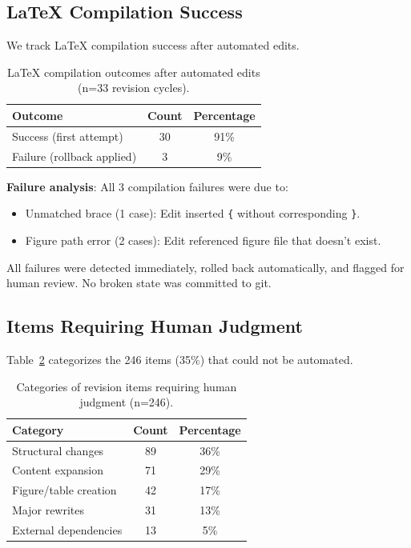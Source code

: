 \subsection{LaTeX Compilation Success}

We track LaTeX compilation success after automated edits.

\begin{table}[t]
\centering
\caption{LaTeX compilation outcomes after automated edits (n=33 revision cycles).}
\label{tab:compilation}
\begin{tabular}{lcc}
\toprule
Outcome & Count & Percentage \\
\midrule
Success (first attempt) & 30 & 91\% \\
Failure (rollback applied) & 3 & 9\% \\
\bottomrule
\end{tabular}
\end{table}

\textbf{Failure analysis}: All 3 compilation failures were due to:
\begin{itemize}
\item Unmatched brace (1 case): Edit inserted \texttt{\{} without corresponding \texttt{\}}.
\item Figure path error (2 cases): Edit referenced figure file that doesn't exist.
\end{itemize}

All failures were detected immediately, rolled back automatically, and flagged for human review. No broken state was committed to git.

\subsection{Items Requiring Human Judgment}
\label{sec:human-required}

Table~\ref{tab:human-required} categorizes the 246 items (35\%) that could not be automated.

\begin{table}[t]
\centering
\caption{Categories of revision items requiring human judgment (n=246).}
\label{tab:human-required}
\begin{tabular}{lcc}
\toprule
Category & Count & Percentage \\
\midrule
Structural changes & 89 & 36\% \\
Content expansion & 71 & 29\% \\
Figure/table creation & 42 & 17\% \\
Major rewrites & 31 & 13\% \\
External dependencies & 13 & 5\% \\
\bottomrule
\end{tabular}
\end{table}

